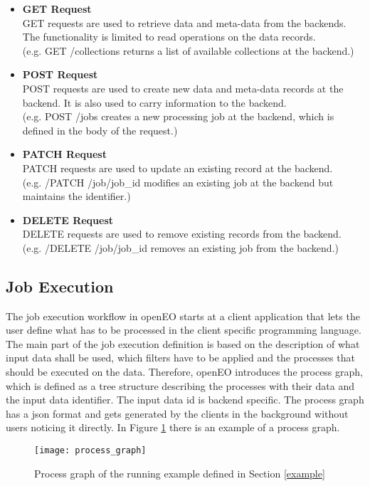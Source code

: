 \documentclass[draft,final]{vutinfth} %
\begin{document}
\begin{itemize}
	\item \textbf{GET Request} \\
	GET requests are used to retrieve data and meta-data from the backends. The functionality is limited to read operations on the data records. \\(e.g. GET /collections returns a list of available collections at the backend.)
	\item \textbf{POST Request} \\ 
	POST requests are used to create new data and meta-data records at the backend. It is also used to carry information to the backend.  \\(e.g. POST /jobs creates a new processing job at the backend, which is defined in the body of the request.)  
	\item \textbf{PATCH Request} \\
	PATCH requests are used to update an existing record at the backend. \\(e.g. /PATCH /job/{job\_id} modifies an existing job at the backend but maintains the identifier.)
	\item \textbf{DELETE Request} \\ 
	DELETE requests are used to remove existing records from the backend. \\(e.g. /DELETE /job/{job\_id} removes an existing job from the backend.)
\end{itemize}

\subsection{Job Execution}\label{Job Execution}
The job execution workflow in openEO starts at a client application that lets the user define what has to be processed in the client specific programming language.
The main part of the job execution definition is based on the description of what input data shall be used, which filters have to be applied and the processes that should be executed on the data. Therefore, openEO introduces the process graph, which is defined as a tree structure describing the processes with their data and the input data identifier. The input data id is backend specific. The process graph has a \gls{json} format and gets generated by the clients in the background without users noticing it directly. In Figure \ref{fig:process_graph} there is an example of a process graph. 

\begin{figure}[h]
	\centering
	\texttt{[image: process\_graph]}
	\caption{Process graph of the running example defined in Section \ref{example}}
	\label{fig:process_graph} %
\end{figure}
\end{document}

